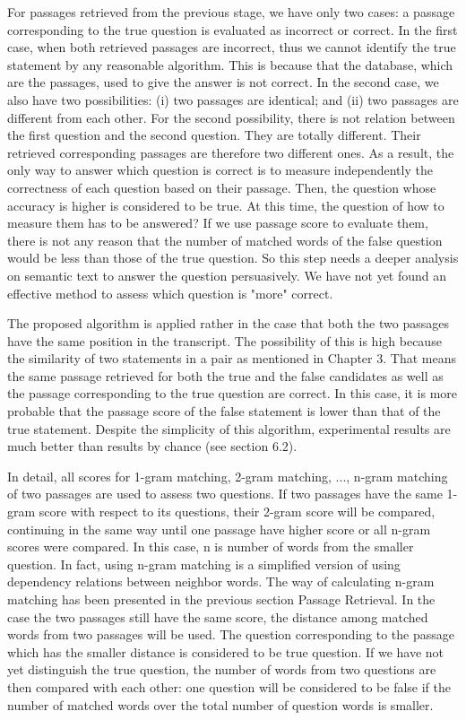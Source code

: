 For passages retrieved from the previous stage, we have only two cases: a passage corresponding to the true question is evaluated as incorrect or correct. In the first case, when both retrieved passages are incorrect, thus we cannot identify the true statement by any reasonable algorithm. This is because that the database, which are the passages, used to give the answer is not correct. In the second case, we also have two possibilities: (i) two passages are identical; and (ii) two passages are different from each other. For the second possibility, there is not relation between the first question and the second question. They are totally different. Their retrieved corresponding passages are therefore two different ones. As a result, the only way to answer which question is correct is to measure independently the correctness of each question based on their passage. Then, the question whose accuracy is higher is considered to be true. At this time, the question of how to measure them has to be answered? If we use passage score to evaluate them, there is not any reason that the number of matched words of the false question would be less than those of the true question. So this step needs a deeper analysis on semantic text to answer the question persuasively. We have not yet found an effective method to assess which question is "more" correct.

The proposed algorithm is applied rather in the case that both the two passages have the same position in the transcript. The possibility of this is high because the similarity of two statements in a pair as mentioned in Chapter 3. That means the same passage retrieved for both the true and the false candidates as well as the passage corresponding to the true question are correct. In this case, it is more probable that the passage score of the false statement is lower than that of the true statement. Despite the simplicity of this algorithm, experimental results are much better than results by chance (see section 6.2).

In detail, all scores for 1-gram matching, 2-gram matching, ..., n-gram matching of two passages are used to assess two questions. If two passages have the same 1-gram score with respect to its questions, their 2-gram score will be compared, continuing in the same way until one passage have higher score or all n-gram scores were compared. In this case, n is number of words from the smaller question. In fact, using n-gram matching is a simplified version of using dependency relations between neighbor words. The way of calculating n-gram matching has been presented in the previous section Passage Retrieval. In the case the two passages still have the same score, the distance among matched words from two passages will be used. The question corresponding to the passage which has the smaller distance is considered to be true question. If we have not yet distinguish the true question, the number of words from two questions are then compared with each other: one question will be considered to be false if the number of matched words over the total number of question words is smaller.

